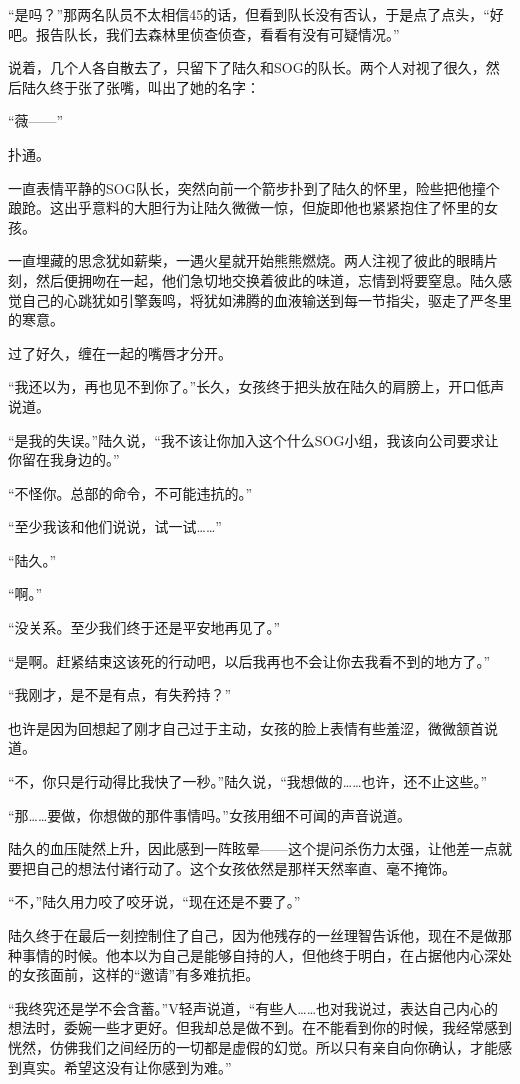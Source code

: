 “是吗？”那两名队员不太相信45的话，但看到队长没有否认，于是点了点头，“好吧。报告队长，我们去森林里侦查侦查，看看有没有可疑情况。”

说着，几个人各自散去了，只留下了陆久和SOG的队长。两个人对视了很久，然后陆久终于张了张嘴，叫出了她的名字：

“薇——”

扑通。

一直表情平静的SOG队长，突然向前一个箭步扑到了陆久的怀里，险些把他撞个踉跄。这出乎意料的大胆行为让陆久微微一惊，但旋即他也紧紧抱住了怀里的女孩。

一直埋藏的思念犹如薪柴，一遇火星就开始熊熊燃烧。两人注视了彼此的眼睛片刻，然后便拥吻在一起，他们急切地交换着彼此的味道，忘情到将要窒息。陆久感觉自己的心跳犹如引擎轰鸣，将犹如沸腾的血液输送到每一节指尖，驱走了严冬里的寒意。

过了好久，缠在一起的嘴唇才分开。

“我还以为，再也见不到你了。”长久，女孩终于把头放在陆久的肩膀上，开口低声说道。

“是我的失误。”陆久说，“我不该让你加入这个什么SOG小组，我该向公司要求让你留在我身边的。”

“不怪你。总部的命令，不可能违抗的。”

“至少我该和他们说说，试一试……”

“陆久。”

“啊。”

“没关系。至少我们终于还是平安地再见了。”

“是啊。赶紧结束这该死的行动吧，以后我再也不会让你去我看不到的地方了。”

“我刚才，是不是有点，有失矜持？”

也许是因为回想起了刚才自己过于主动，女孩的脸上表情有些羞涩，微微颔首说道。

“不，你只是行动得比我快了一秒。”陆久说，“我想做的……也许，还不止这些。”

“那……要做，你想做的那件事情吗。”女孩用细不可闻的声音说道。

陆久的血压陡然上升，因此感到一阵眩晕——这个提问杀伤力太强，让他差一点就要把自己的想法付诸行动了。这个女孩依然是那样天然率直、毫不掩饰。

“不，”陆久用力咬了咬牙说，“现在还是不要了。”

陆久终于在最后一刻控制住了自己，因为他残存的一丝理智告诉他，现在不是做那种事情的时候。他本以为自己是能够自持的人，但他终于明白，在占据他内心深处的女孩面前，这样的“邀请”有多难抗拒。

“我终究还是学不会含蓄。”V轻声说道，“有些人……也对我说过，表达自己内心的想法时，委婉一些才更好。但我却总是做不到。在不能看到你的时候，我经常感到恍然，仿佛我们之间经历的一切都是虚假的幻觉。所以只有亲自向你确认，才能感到真实。希望这没有让你感到为难。”

